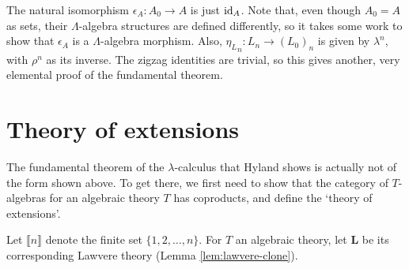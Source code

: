 \begin{remark}
  The natural isomorphism $ \epsilon_A: A_0 \to A $ is just $ \text{id}_{A} $. Note that, even though $ A_0 = A $ as sets, their $ \Lambda $-algebra structures are defined differently, so it takes some work to show that $ \epsilon_A $ is a $ \Lambda $-algebra morphism. Also, $ {\eta_L}_n : L_n \to (L_0)_n $ is given by $ \lambda^n $, with $ \rho^n $ as its inverse. The zigzag identities are trivial, so this gives another, very elemental proof of the fundamental theorem.
\end{remark}

\section{Theory of extensions}

The fundamental theorem of the $ \lambda $-calculus that Hyland shows is actually not of the form shown above. To get there, we first need to show that the category of $ T $-algebras for an algebraic theory $ T $ has coproducts, and define the `theory of extensions'.

Let $ \llbracket n \rrbracket $ denote the finite set $ \{ 1, 2, \dots, n \} $. For $ T $ an algebraic theory, let $ \mathbf L $ be its corresponding Lawvere theory (Lemma \ref{lem:lawvere-clone}).


